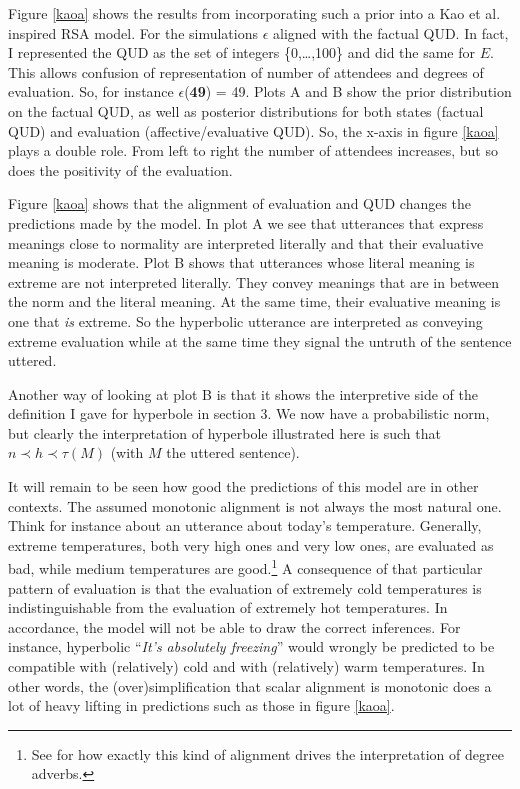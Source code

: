 \documentclass[a4paper,12pt,twoside]{article}
\begin{document}
Figure \ref{kaoa} shows the results from incorporating such a prior into a Kao et al. inspired RSA model. For the simulations $\epsilon$ aligned with the factual QUD. In fact, I represented the QUD as the set of integers \{0,\ldots,100\} and did the same for $E$. This allows confusion of representation of number of attendees and degrees of evaluation. So, for instance $\epsilon$({\bf 49}) = 49.   
Plots A and B show the prior distribution on the factual QUD, as well as posterior distributions for both states (factual QUD) and evaluation (affective/evaluative QUD). So, the x-axis in figure \ref{kaoa} plays a double role. From left to right the number of attendees increases, but so does the positivity of the evaluation.

Figure \ref{kaoa} shows that the alignment of evaluation and QUD changes the predictions made by the model. In plot A we see that utterances that express meanings close to normality are interpreted literally and that their evaluative meaning is moderate. Plot B shows that utterances whose literal meaning is extreme are not interpreted literally. They convey meanings that are in between the norm and the literal meaning. At the same time, their evaluative meaning is one that {\em is} extreme. So the hyperbolic utterance are interpreted as conveying extreme evaluation while at the same time they signal the untruth of the sentence uttered.

Another way of looking at plot B is that it shows the interpretive side of the definition I gave for hyperbole in section 3. We now have a probabilistic norm, but clearly the interpretation of hyperbole illustrated here is such that $n\prec h\prec \tau(M)$ (with $M$ the uttered sentence).
  
It will remain to be seen how good the predictions of this model are in other contexts. The assumed monotonic alignment is not always the most natural one. Think for instance about an utterance about today's temperature. Generally, extreme temperatures, both very high ones and very low ones, are evaluated as bad, while medium temperatures are good.\footnote{See \citet{nouwengoldi} for how exactly this kind of alignment drives the interpretation of degree adverbs.} A consequence of that particular pattern of evaluation is that the evaluation of extremely cold temperatures is indistinguishable from the evaluation of extremely hot temperatures. In accordance, the model will not be able to draw the correct inferences. For instance, hyperbolic ``{\em It's absolutely freezing}'' would wrongly be predicted to be compatible with (relatively) cold and with (relatively) warm temperatures. In other words, the (over)simplification that scalar alignment is monotonic does a lot of heavy lifting in predictions such as those in figure \ref{kaoa}.
\end{document}
